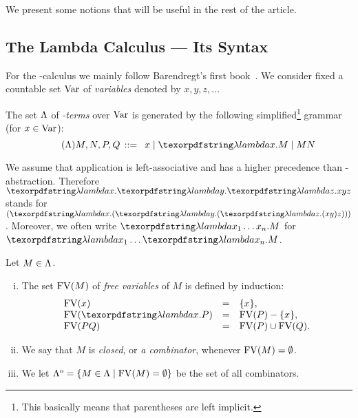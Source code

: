 
We present some notions that will be useful in the rest of the article.

\subsection{The Lambda Calculus --- Its Syntax}\label{subsec:lamcal}

For the \lam-calculus we mainly follow Barendregt's first book~\cite{Bare}.
We consider fixed a countable set $\mathrm{Var}$ of \emph{variables} denoted by $x,y,z,\dots$
\begin{defi}
The set $\Lambda$ of \emph{\lam-terms} over $\mathrm{Var}$ is generated by the following simplified\footnote{
This basically means that parentheses are left implicit.} grammar (for $x\in\mathrm{Var}$):
\begin{equation}\tag{$\Lambda$}
M,N,P,Q \eqbnf\ x\mid \lam x.M\mid MN
\end{equation}
\end{defi}
We assume that application is left-associative and has a higher precedence than \lam-abstraction. Therefore $\lam x.\lam y.\lam z.xyz$ stands for $(\lam x.(\lam y.(\lam z.(xy)z)))$.
Moreover, we often write $\lam x_1\dots x_n.M$ for $\lam x_1\dots \lam x_n.M$.

\begin{defi} Let $M\in\Lambda$.
\begin{enumerate}[(i)]
\item The set $\mathrm{FV}(M)$ of \emph{free variables} of $M$ is defined by induction:
\[
	\begin{array}{lll}
	\FV{x} &=& \set{x},\\
	\FV{\lam x.P} &=& \FV{P} -\set{x},\\
	\FV{PQ} &=&\FV{P}\cup\FV{Q}.\\
	\end{array}
\]
\item We say that $M$ is \emph{closed}, or \emph{a combinator}, whenever $\mathrm{FV}(M) = \emptyset$.
\item We let $\Lambda^o = \{ M\in\Lambda \mid \mathrm{FV}(M) = \emptyset\}$ be the set of all combinators.
\end{enumerate}
\end{defi}

